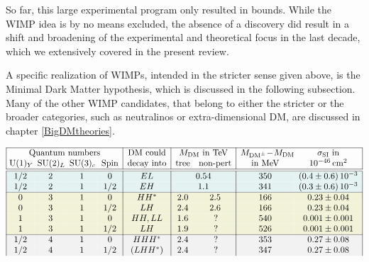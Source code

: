 So far, this large experimental program only resulted in bounds. 
While the WIMP idea is by no means excluded, the absence of a discovery did result  in a shift and broadening of the experimental and theoretical focus  in the last decade, which we extensively covered in the present review. 

\medskip

A specific realization of WIMPs, intended in the stricter sense given above, is the Minimal Dark Matter hypothesis, which is discussed in the following subsection. Many of the other WIMP candidates, that belong to either the stricter or the broader categories, such as neutralinos or extra-dimensional DM, are discussed in chapter \ref{BigDMtheories}.





\begin{table}[t]
\begin{center}
\small
$$\begin{array}{|cccc|c|cc|cc|}\hline
\multicolumn{4}{|c|}{\hbox{Quantum numbers}}
&\hbox{DM could}& \multicolumn{2}{c|}{\hbox{$M_{\rm DM}$ in TeV}}&M_{{\rm DM}^\pm} \!-\! M_{\rm DM}\!\!\!&
 \hbox{$\sigma_{\rm SI}$ in}  \\
\!{\rm U}(1)_Y\! \!& \! \!\SU(2)_L\! \!&\!\!\SU(3)_c\! \!& \hbox{Spin} &
 \hbox{decay into} & \hbox{tree}  & \hbox{non-pert} &\hbox{in MeV} &
 \hbox{$10^{-46}\,{\rm cm}^2$} \\ \hline
 \hline \rowcolor[rgb]{0.9,0.95,0.95}
1/2 &2 & 1 & 0 & EL & \multicolumn{2}{c|}{0.54}  & 350 & (0.4\pm 0.6)\,10^{-3} \\  \rowcolor[rgb]{0.9,0.95,0.95}
1/2  & 2&1& 1/2 & EH & \multicolumn{2}{c|}{1.1}  & 341 & (0.3\pm 0.6)\,10^{-3}\\   \rowcolor[rgb]{0.95,0.95,0.85}
\hline
0&3&1&  0 & HH^* & 2.0&  2.5  & 166& 0.23\pm 0.04 \\  \rowcolor[rgb]{0.95,0.95,0.85}
0&3&1 & 1/2 & LH & 2.4&  2.6  & 166 & 0.23\pm 0.04\\  \rowcolor[rgb]{0.95,0.95,0.85}
1&3&1& 0 & HH,LL & 1.6&  \,?  & 540 &0.001\pm 0.001\\ \rowcolor[rgb]{0.95,0.95,0.85}
1&3 & 1 & 1/2 & LH & 1.9& \, ? & 526  & 0.001\pm 0.001\\ \rowcolor[rgb]{0.95,0.95,0.95}
\hline
1/2  & 4 &1 & 0 & HHH^* & 2.4& \,?  & 353 & 0.27\pm 0.08\\  \rowcolor[rgb]{0.95,0.95,0.95}
1/2 &4 & 1& 1/2 & (LHH^*) & 2.4& \,?  & 347  & 0.27\pm 0.08\\  \rowcolor[rgb]{0.95,0.95,0.95}

\end{array}$$
\end{center}
\end{table}
